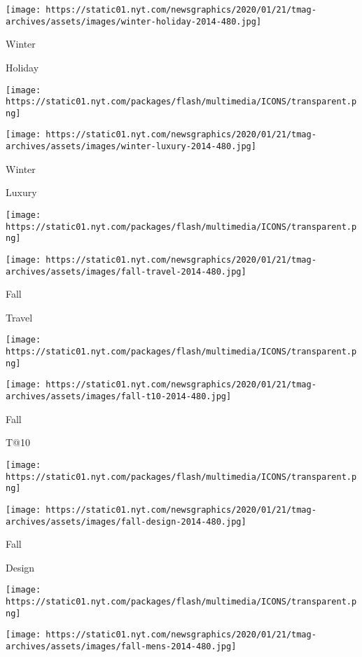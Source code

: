 \texttt{[image: https://static01.nyt.com/newsgraphics/2020/01/21/tmag-archives/assets/images/winter-holiday-2014-480.jpg]}

Winter

Holiday

\href{https://www.nytimes.com/indexes/2014/11/16/t-magazine/womens-fashion-issue/index.html}{}

\texttt{[image: https://static01.nyt.com/packages/flash/multimedia/ICONS/transparent.png]}

\texttt{[image: https://static01.nyt.com/newsgraphics/2020/01/21/tmag-archives/assets/images/winter-luxury-2014-480.jpg]}

Winter

Luxury

\href{https://www.nytimes.com/indexes/2014/11/02/t-magazine/travel-issue/index.html}{}

\texttt{[image: https://static01.nyt.com/packages/flash/multimedia/ICONS/transparent.png]}

\texttt{[image: https://static01.nyt.com/newsgraphics/2020/01/21/tmag-archives/assets/images/fall-travel-2014-480.jpg]}

Fall

Travel

\href{https://www.nytimes.com/indexes/2014/10/22/t-magazine/design-issue/index.html}{}

\texttt{[image: https://static01.nyt.com/packages/flash/multimedia/ICONS/transparent.png]}

\texttt{[image: https://static01.nyt.com/newsgraphics/2020/01/21/tmag-archives/assets/images/fall-t10-2014-480.jpg]}

Fall

T@10

\href{https://www.nytimes.com/indexes/2014/10/01/t-magazine/design-issue/index.html}{}

\texttt{[image: https://static01.nyt.com/packages/flash/multimedia/ICONS/transparent.png]}

\texttt{[image: https://static01.nyt.com/newsgraphics/2020/01/21/tmag-archives/assets/images/fall-design-2014-480.jpg]}

Fall

Design

\href{https://www.nytimes.com/indexes/2014/09/14/t-magazine/mens-fashion-issue/index.html}{}

\texttt{[image: https://static01.nyt.com/packages/flash/multimedia/ICONS/transparent.png]}

\texttt{[image: https://static01.nyt.com/newsgraphics/2020/01/21/tmag-archives/assets/images/fall-mens-2014-480.jpg]}

